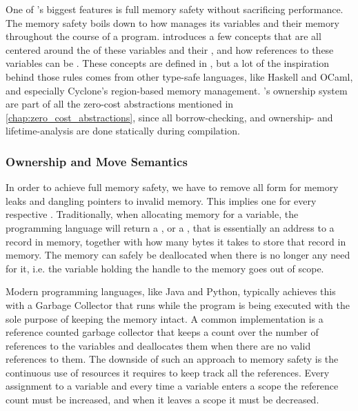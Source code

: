 One of {\rust}'s biggest features is full memory safety \cite{web:rust_book_unsafe} without sacrificing performance.
The memory safety boils down to how {\rust} manages its variables and their memory throughout the course of a program.
\rust introduces a few concepts that are all centered around the  of these variables and their , and how references to these variables can be .
These concepts are defined in {\rust}, but a lot of the inspiration behind those rules comes from other type-safe languages, like Haskell and OCaml, and especially Cyclone's \cite{Grossman2002,Swamy2006} region-based memory management.
\rust's ownership system are part of all the zero-cost abstractions mentioned in \autoref{chap:zero_cost_abstractions}, since all borrow-checking, and ownership- and lifetime-analysis are done statically during compilation.

\subsubsection{Ownership and Move Semantics}
\label{sec:back:rust:own}

In order to achieve full memory safety, we have to remove all form for memory leaks and dangling pointers to invalid memory.
This implies one  for every respective .
Traditionally, when allocating memory for a variable, the programming language will return a ,  or a , that is essentially an address to a record in memory, together with how many bytes it takes to store that record in memory.
The memory can safely be deallocated when there is no longer any need for it, i.e. the variable holding the handle to the memory goes out of scope.

Modern programming languages, like Java and Python, typically achieves this with a Garbage Collector that runs while the program is being executed with the sole purpose of keeping the memory intact.
A common implementation is a reference counted garbage collector that keeps a count over the number of references to the variables and deallocates them when there are no valid references to them.
The downside of such an approach to memory safety is the continuous use of resources it requires to keep track all the references.
Every assignment to a variable and every time a variable enters a scope the reference count must be increased, and when it leaves a scope it must be decreased.

